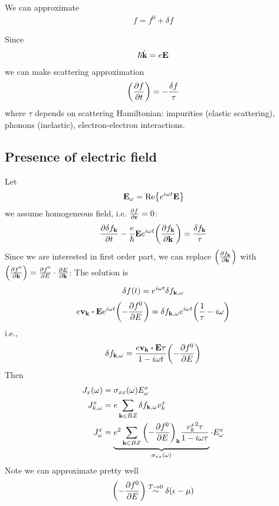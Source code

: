 We can approximate
\begin{align}
f = f^0 + \delta f
\end{align}

Since
\begin{align}
\hbar \dot{\vb{k}} = e\vb{E}
\end{align}
we can make scattering approximation
\begin{align}
\qty(\pdv{f}{t}) = -\frac{\delta f}{\tau}
\end{align}
where $\tau$ depends on scattering Hamiltonian: impurities (elastic scattering), phonons (inelastic), electron-electron interactions.

\subsection{Presence of electric field}
Let
\begin{align}
\vb{E}_{\vb{\omega}} = \Re{ e^{i\omega t}\vb{E} }
\end{align}
we assume homogeneous field, i.e. $\pdv{f}{\vb{r}}=0$:
\begin{align}
\pdv{\delta f_{\vb{k}}}{t}  - \frac{e}{\hbar} \vb{E} e^{i\omega t} \qty(\pdv{f_{\vb{k}}}{\vb{k}}) = \frac{\delta f_{\vb{k}}}{\tau}
\end{align}
Since we are interested in first order part, we can replace $ \qty(\pdv{f_{\vb{k}}}{\vb{k}})$ with $ \qty(\pdv{f^0}{\vb{k}}) = \pdv{f^0}{E} \cdot \pdv{E}{\vb{k}}$:
The solution is 
\begin{align}
\delta f(t) = e^{i \omega t} \delta f_{\vb{k}, \omega}
\end{align}
\begin{align}
e \vb{v}_{\vb{k}} \vdot \vb{E} e^{i\omega t} \qty(-\pdv{f^0}{E}) = \delta f_{\vb{k}, \omega} e^{i\omega t} \qty(\frac{1}{\tau} - i \omega)
\end{align}
i.e.,
\begin{align}
\delta f_{\vb{k}, \omega} = \frac{e \vb{v}_{\vb{k}} \vdot \vb{E} \tau}{1-i\omega t}  \qty(-\pdv{f^0}{E}) 
\end{align}
Then
\begin{align}
J_x(\omega) &= \sigma_{xx}(\omega) E^x_\omega\\
J^x_{k,\omega} &= e \sum_{\vb{k} \in BZ} \delta f_{\vb{k}, \omega} v_k^x\\
J^x_\omega &= \underbrace{e^2 \sum_{\vb{k} \in BZ} \qty(-\pdv{f^0}{E})_{\vb{k}} \frac{{ v_k^x }^2 \tau}{1-i\omega \tau}}_{\sigma_{xx}(\omega)} \cdot E^x_\omega\\
\end{align}
Note we can approximate pretty well 
\begin{align}
\qty(-\pdv{f^0}{E}) \stackrel{T\to 0}{\sim} \delta(\epsilon-\mu)
\end{align}

